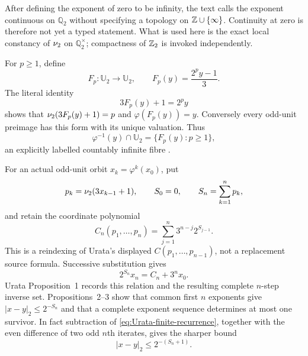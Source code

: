 \begin{sourceissue}
After defining the exponent of zero to be infinity, the text calls the
exponent continuous on $\mathbb Q_2$ without specifying a topology on
$\mathbb{Z}\cup\{\infty\}$.  Continuity at zero is therefore not yet a typed
statement.  What is used here is the exact local constancy of $\nu_{2}$ on
$\mathbb Q_2^{\times}$; compactness of $\mathbb{Z}_{2}$ is invoked independently.
\end{sourceissue}

For $p\geq1$, define
\begin{equation}
\label{eq:Urata-inverse-branch}
 F_p:\mathbb U_2\longrightarrow\mathbb U_2,
 \qquad F_p(y)=\frac{2^p y-1}{3}.
\end{equation}
The literal identity
\[
 3F_p(y)+1=2^p y
\]
shows that $\nu_{2}(3F_p(y)+1)=p$ and $\varphi(F_p(y))=y$.  Conversely every
odd-unit preimage has this form with its unique valuation.  Thus
\begin{equation}
\label{eq:Urata-fibre}
 \varphi^{-1}(y)\cap\mathbb U_2
 =\{F_p(y):p\geq1\},
\end{equation}
an explicitly labelled countably infinite fibre
\cite[printed p.~8, Example~2]{Urata2003}.

For an actual odd-unit orbit $x_k=\varphi^k(x_0)$, put
\[
 p_k=\nu_{2}(3x_{k-1}+1),\qquad
 S_0=0,\qquad S_n=\sum_{k=1}^{n}p_k,
\]
and retain the coordinate polynomial
\begin{equation}
\label{eq:Urata-Cn}
 C_n(p_1,\ldots,p_n)
 =\sum_{j=1}^{n}3^{n-j}2^{S_{j-1}}.
\end{equation}
This is a reindexing of Urata's displayed $C(p_1,\ldots,p_{n-1})$, not a
replacement source formula.  Successive substitution gives
\begin{equation}
\label{eq:Urata-finite-recurrence}
 2^{S_n}x_n=C_n+3^n x_0.
\end{equation}
Urata Proposition~1 records this relation and the resulting complete
$n$-step inverse set.  Propositions~2--3 show that common first $n$ exponents
give $|x-y|_2\leq2^{-S_n}$ and that a complete exponent sequence determines at
most one survivor.  In fact subtraction of
\eqref{eq:Urata-finite-recurrence}, together with the even difference of two
odd $n$th iterates, gives the sharper bound
\begin{equation}
\label{eq:Urata-sharp-prefix-bound}
 |x-y|_2\leq2^{-(S_n+1)}.
\end{equation}

